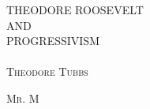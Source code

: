 \newcommand*{\titleGP}{\begingroup %
\centering %
\vspace*{\baselineskip} %


{\LARGE THEODORE ROOSEVELT\\ AND \\[0.3\baselineskip] PROGRESSIVISM}\\~\\[0.2\baselineskip] %


\scshape %
Theodore Tubbs
\vspace*{2\baselineskip} %


\vfill %

\scshape Mr. M\\[0.3\baselineskip] %

\endgroup}


\thispagestyle{empty} %

\titleGP %
